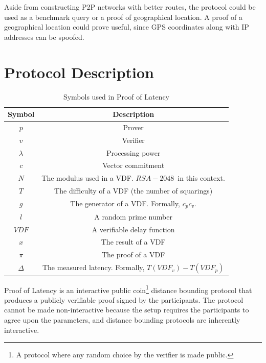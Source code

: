 Aside from constructing P2P networks with better routes, the protocol could be used as a benchmark query or a proof of geographical location. A proof of a geographical location could prove useful, since GPS coordinates along with IP addresses can be spoofed.

\section{Protocol Description}
\begin{table}[h!]
	\centering
	\begin{tabular}{ c|c  }
		Symbol        & Description                                             \\
		\hline
		\( p \)       & Prover                                                  \\
		\( v \)       & Verifier                                                \\
		\( \lambda \) & Processing power                                        \\
		\( c \)       & Vector commitment                                       \\
		\( N \)       & The modulus used in a VDF. \(RSA-2048\)~in this context.   \\

		\( T \)       & The difficulty of a VDF (the number of squarings)       \\
		\( g \)       & The generator of a VDF. Formally, \(c_p c_v\).          \\
		\( l \)       & A random prime number                                   \\
		\( VDF \)     & A verifiable delay function                             \\
		\( x \)       & The result of a VDF                                     \\
		\(\pi \)      & The proof of a VDF                                      \\
		\(\Delta\)    & The measured latency. Formally, \(T(VDF_v) - T(VDF_p)\) \\
	\end{tabular}
	\caption{Symbols used in Proof of Latency}
	\label{table:1}
\end{table}

Proof of Latency is an interactive public coin\footnote{A protocol where any random choice by the verifier is made public.} distance bounding protocol that produces a publicly verifiable proof signed by the participants. The protocol cannot be made non-interactive because the setup requires the participants to agree upon the parameters, and distance bounding protocols are inherently interactive.

